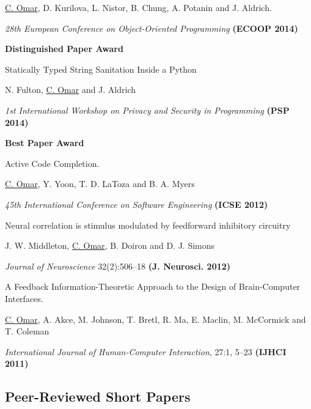 \documentclass[10pt,letterpaper]{article}
\renewenvironment{itemize}{
  \begin{list}{}{
    \setlength{\leftmargin}{1.25em}
    \setlength{\itemsep}{0.25em}
    \setlength{\parskip}{0pt}
    \setlength{\parsep}{0.2em}
  }
}{
  \end{list}
}
\begin{document}
\begin{enumerate}
  \begin{itemize}
    \item \underline{C. Omar}, D. Kurilova, L. Nistor, B. Chung, A. Potanin and J. Aldrich.
    \item \textit{28th European Conference on Object-Oriented Programming} {\textbf{(ECOOP 2014)}}
    \item \textbf{Distinguished Paper Award}
  \end{itemize}
\item Statically Typed String Sanitation Inside a Python
  \begin{itemize}
    \item N. Fulton, \underline{C. Omar} and J. Aldrich
    \item \textit{1st International Workshop on Privacy and Security in Programming} {\textbf{(PSP 2014)}}
    \item \textbf{Best Paper Award}
  \end{itemize}  
\item {Active Code Completion}.
  \begin{itemize}
      \item \underline{C. Omar}, Y. Yoon, T. D. LaToza and B. A. Myers
      \item \textit{45th International Conference on Software Engineering} {\textbf{(ICSE 2012)}}
  \end{itemize}
\item {Neural correlation is stimulus modulated by feedforward inhibitory circuitry}
  \begin{itemize}
    \item J. W. Middleton, \underline{C. Omar}, B. Doiron and D. J. Simons
    \item \textit{Journal of Neuroscience} 32(2):506--18 {\textbf{(J. Neurosci. 2012)}}
  \end{itemize}
\item A Feedback Information-Theoretic Approach to the Design of Brain-Computer Interfaces.
  \begin{itemize}
    \item  \underline{C. Omar}, A. Akce, M. Johnson, T. Bretl, R. Ma, E. Maclin, M. McCormick and T. Coleman
    \item \textit{International Journal of Human-Computer Interaction}, 27:1, 5--23 {\textbf{(IJHCI 2011)}}
  \end{itemize}
\end{enumerate}

\subsection*{Peer-Reviewed Short Papers}
\end{document}
